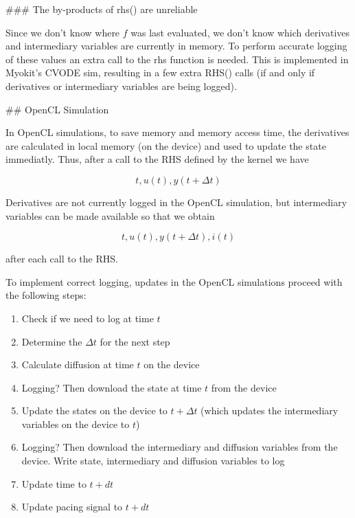 ### The by-products of rhs() are unreliable

Since we don't know where $f$ was last evaluated, we don't know which derivatives and intermediary variables are currently in memory.
To perform accurate logging of these values an extra call to the rhs function is needed.
This is implemented in Myokit's CVODE sim, resulting in a few extra RHS() calls (if and only if derivatives or intermediary variables are being logged).

## OpenCL Simulation

In OpenCL simulations, to save memory and memory access time, the derivatives are calculated in local memory (on the device) and used to update the state immediatly.
Thus, after a call to the RHS defined by the kernel we have
\begin{linenomath}
\begin{equation}
t,u\left(t\right),y\left(t+\Delta t\right)
\end{equation}
\end{linenomath}
Derivatives are not currently logged in the OpenCL simulation, but intermediary variables can be made available so that we obtain
\begin{linenomath}
\begin{equation}
t,u\left(t\right),y\left(t+\Delta t\right),i\left(t\right)
\end{equation}
\end{linenomath}
after each call to the RHS.

To implement correct logging, updates in the OpenCL simulations proceed with the following steps:

\begin{enumerate}
\item Check if we need to log at time $t$
\item Determine the $\Delta t$ for the next step
\item Calculate diffusion at time $t$ on the device
\item Logging? Then download the state at time $t$ from the device
\item Update the states on the device to $t+\Delta t$ (which updates the intermediary variables on the device to $t$)
\item Logging? Then download the intermediary and diffusion variables from the device. Write state, intermediary and diffusion variables to log
\item Update time to $t+dt$
\item Update pacing signal to $t+dt$
\end{enumerate}

